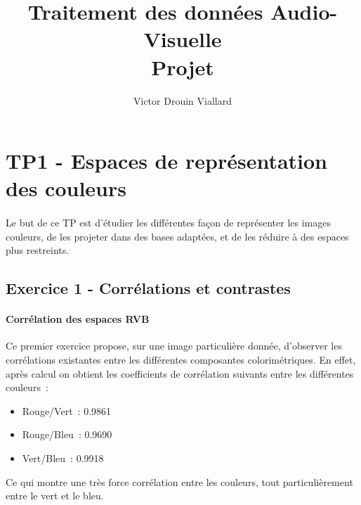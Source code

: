 \documentclass{article}
\title{Traitement des données Audio-Visuelle\\Projet}
\author{Victor Drouin Viallard}
\begin{document}
\maketitle
\clearpage
\tableofcontents
\clearpage

\section{TP1 - Espaces de représentation des couleurs}
\paragraph{}
Le but de ce TP est d'étudier les différentes façon de représenter les images couleurs, de les projeter dans des bases adaptées, et de les réduire à des espaces plus restreints.
\subsection{Exercice 1 - Corrélations et contrastes}
\paragraph{Corrélation des espaces RVB}
Ce premier exercice propose, sur une image particulière donnée, d'observer les corrélations existantes entre les différentes composantes colorimétriques. En effet, après calcul on obtient les coefficients de corrélation suivants entre les différentes couleurs~:
\begin{itemize}
    \item Rouge/Vert~: 0.9861
    \item Rouge/Bleu~: 0.9690
    \item Vert/Bleu~: 0.9918
\end{itemize}
Ce qui montre une très force corrélation entre les couleurs, tout particulièrement entre le vert et le bleu.
\end{document}
